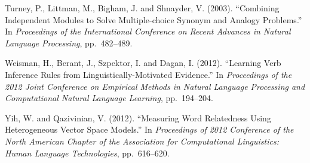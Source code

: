 \documentclass[japanese]{jnlp_1.4}
\begin{document}
\begin{thebibliography}{}
\item
Turney, P., Littman, M., Bigham, J. and Shnayder, V. (2003). ``Combining 
Independent Modules to Solve Multiple-choice Synonym and Analogy Problems.'' 
In \textit{Proceedings of the International Conference on Recent Advances in Natural Language Processing}, pp.~482--489.

\item
Weisman, H., Berant, J., Szpektor, I. and Dagan, I. (2012). ``Learning Verb 
Inference Rules from Linguistically-Motivated Evidence.'' In \textit{Proceedings of the 2012 Joint Conference on Empirical Methods in Natural Language Processing and Computational Natural Language Learning}, pp.~194--204.

\item
Yih, W. and Qazivinian, V. (2012). ``Measuring Word Relatedness Using 
Heterogeneous Vector Space Models.'' In \textit{Proceedings of 2012 Conference of the North American Chapter of the Association for Computational Linguistics: Human Language Technologies}, pp.~616--620.
\end{thebibliography}

\begin{biography}







\end{biography}



\biodate
\end{document}
